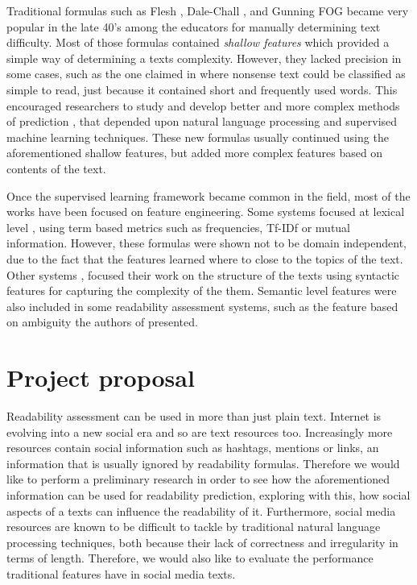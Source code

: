 \documentclass[11pt,twocolumn]{article}
\begin{document}
Traditional formulas such as Flesh \cite{flesch1948new}, Dale-Chall \cite{chall1995readability}, and Gunning FOG \cite{albright1996readability} became very popular in the late 40's among the educators for manually determining text difficulty. Most of those formulas contained \textit{shallow features} which provided a simple way of determining a texts complexity. However, they lacked precision in some cases, such as the one claimed in \cite{davison1982failure} where nonsense text could be classified as simple to read, just because it contained short and frequently used words. This encouraged researchers to study and develop better and more complex methods of prediction \cite{franccois2012ai,aluisio2010readability}, that depended upon natural language processing and supervised machine learning techniques. These new formulas usually continued using the aforementioned shallow  features, but added more complex features based on contents of the text. 

Once the supervised learning framework became common in the field, most of the works have been focused on feature engineering. Some systems focused at lexical level \cite{feng2010comparison,collins2004language}, using term based metrics such as frequencies, Tf-IDf or mutual information. However, these formulas were shown not to be domain independent\cite{collins2004language}, due to the fact that the features learned where to close to the topics of the text. Other systems \cite{feng2009automatic,bonsall2015plain}, focused their work on the structure of the texts using syntactic features for capturing the complexity of the them. Semantic level features were also included in some readability assessment systems, such as the feature based on ambiguity the authors of \cite{aluisio2010readability} presented.





\section{Project proposal}

Readability assessment can be used in more than just plain text. Internet is evolving into a new social era and so are text resources too. Increasingly more resources contain social information such as hashtags, mentions or links, an information that is usually ignored by readability formulas. Therefore we would like to perform a preliminary research in order to see how the aforementioned information can be used for readability prediction, exploring with this, how social aspects of a texts can influence the readability of it. Furthermore, social media resources are known to be difficult to tackle by traditional natural language processing techniques, both because their lack of correctness and irregularity in terms of length. Therefore, we would also like to evaluate the performance traditional features have in social media texts.
\end{document}

